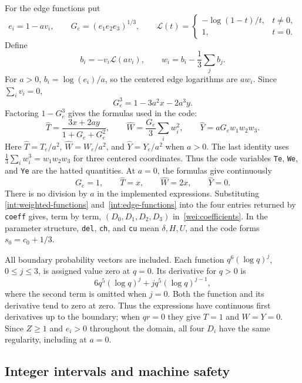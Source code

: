 For the edge functions put
\[
 e_i=1-av_i,\qquad G_e=(e_1e_2e_3)^{1/3},\qquad
 \mathcal L(t)=\begin{cases}-\log(1-t)/t,&t\ne0,\\1,&t=0.
 \end{cases}
\]
Define
\[
 b_i=-v_i\mathcal L(av_i),\qquad
 w_i=b_i-\frac13\sum_jb_j.
\]
For $a>0$, $b_i=\log(e_i)/a$, so the centered edge logarithms are
$aw_i$.  Since $\sum_i v_i=0$,
\[
 G_e^3=1-3a^2x-2a^3y.
\]
Factoring $1-G_e^3$ gives the formulas used in the code:
\begin{equation}
 \widehat T=\frac{3x+2ay}{1+G_e+G_e^2},\qquad
 \widehat W=\frac{G_e}{3}\sum_iw_i^2,\qquad
 \widehat Y=aG_ew_1w_2w_3.
 \label{int:edge-functions}
\end{equation}
Here $\widehat T=T_e/a^2$, $\widehat W=W_e/a^2$, and
$\widehat Y=Y_e/a^2$ when $a>0$.  The last identity uses
$\frac13\sum_iw_i^3=w_1w_2w_3$ for three centered coordinates.
Thus the code variables \texttt{Te}, \texttt{We}, and \texttt{Ye} are
the hatted quantities.  At $a=0$, the formulas give continuously
\[
 G_e=1,\qquad \widehat T=x,\qquad
 \widehat W=2x,\qquad \widehat Y=0.
\]
There is no division by $a$ in the implemented expressions.  Substituting
\eqref{int:weighted-functions} and~\eqref{int:edge-functions} into the
four entries returned by \texttt{coeff} gives, term by term,
$(D_0,D_1,D_2,D_3)$ in~\eqref{wei:coefficients}.  In the parameter
structure, \texttt{del}, \texttt{ch}, and \texttt{cu} mean
$\delta,H,U$, and the code forms $s_0=c_0+1/3$.

All boundary probability vectors are included.  Each function
$q^6(\log q)^j$, $0\le j\le3$, is assigned value zero at $q=0$.
Its derivative for $q>0$ is
\begin{equation}
 6q^5(\log q)^j+jq^5(\log q)^{j-1},
 \label{int:log-product-derivative}
\end{equation}
where the second term is omitted when $j=0$.  Both the function and
its derivative tend to zero at zero.  Thus the expressions have
continuous first derivatives up to the boundary; when $qr=0$ they give
$T=1$ and $W=Y=0$.  Since $Z\ge1$ and $e_i>0$ throughout the domain,
all four $D_i$ have the same regularity, including at $a=0$.

\subsection{Integer intervals and machine safety}
\label{int:arithmetic}

